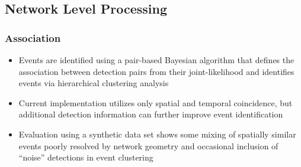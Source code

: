 \documentclass[letterpaper,10pt,english]{sphinxmanual}
\begin{document}
\subsection{Network Level Processing}
\label{\detokenize{algorithms:network-level-processing}}

\subsubsection{Association}
\label{\detokenize{algorithms:association}}\begin{itemize}
\item {} 
Events are identified using a pair-based Bayesian algorithm that defines the association between detection pairs from their joint-likelihood and identifies events via hierarchical clustering analysis

\item {} 
Current implementation utilizes only spatial and temporal coincidence, but additional detection information can further improve event identification

\item {} 
Evaluation using a synthetic data set shows some mixing of spatially similar events poorly resolved by network geometry and occasional inclusion of “noise” detections in event clustering

\end{itemize}
\end{document}
